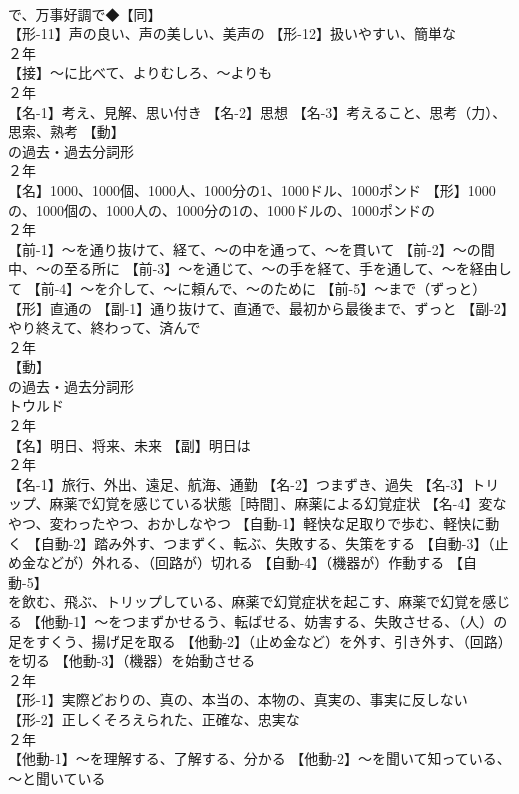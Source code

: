 \documentclass[8pt]{extreport}
\begin{document}
\begin{CJK}{UTF8}{min}
\\	で、万事好調で◆【同】
\\	【形-11】声の良い、声の美しい、美声の 【形-12】扱いやすい、簡単な
\\	２年	
\\	【接】～に比べて、よりむしろ、～よりも
\\	２年	
\\	【名-1】考え、見解、思い付き 【名-2】思想 【名-3】考えること、思考（力）、思索、熟考 【動】
\\	の過去・過去分詞形
\\	２年	
\\	【名】1000、1000個、1000人、1000分の1、1000ドル、1000ポンド 【形】1000の、1000個の、1000人の、1000分の1の、1000ドルの、1000ポンドの
\\	２年	
\\	【前-1】～を通り抜けて、経て、～の中を通って、～を貫いて 【前-2】～の間中、～の至る所に 【前-3】～を通じて、～の手を経て、手を通して、～を経由して 【前-4】～を介して、～に頼んで、～のために 【前-5】～まで（ずっと） 【形】直通の 【副-1】通り抜けて、直通で、最初から最後まで、ずっと 【副-2】やり終えて、終わって、済んで
\\	２年	
\\	【動】
\\	の過去・過去分詞形 
\\	トウルド
\\	２年	
\\	【名】明日、将来、未来 【副】明日は
\\	２年	
\\	【名-1】旅行、外出、遠足、航海、通勤 【名-2】つまずき、過失 【名-3】トリップ、麻薬で幻覚を感じている状態［時間］、麻薬による幻覚症状 【名-4】変なやつ、変わったやつ、おかしなやつ 【自動-1】軽快な足取りで歩む、軽快に動く 【自動-2】踏み外す、つまずく、転ぶ、失敗する、失策をする 【自動-3】（止め金などが）外れる、（回路が）切れる 【自動-4】（機器が）作動する 【自動-5】
\\	を飲む、飛ぶ、トリップしている、麻薬で幻覚症状を起こす、麻薬で幻覚を感じる 【他動-1】～をつまずかせるう、転ばせる、妨害する、失敗させる、（人）の足をすくう、揚げ足を取る 【他動-2】（止め金など）を外す、引き外す、（回路）を切る 【他動-3】（機器）を始動させる
\\	２年	
\\	【形-1】実際どおりの、真の、本当の、本物の、真実の、事実に反しない 【形-2】正しくそろえられた、正確な、忠実な
\\	２年	
\\	【他動-1】～を理解する、了解する、分かる 【他動-2】～を聞いて知っている、～と聞いている

\end{CJK}
\end{document}
